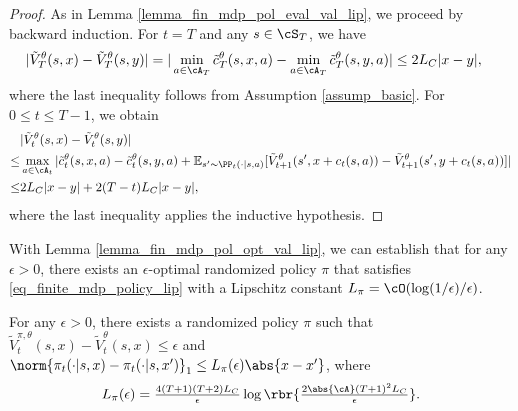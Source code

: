 \documentclass[9pt]{article}
\numberwithin{equation}{section}
\renewcommand{\frac}[2]{\tfrac{#1}{#2}}
\begin{document}
\begin{proof}
As in Lemma \ref{lemma_fin_mdp_pol_eval_val_lip}, we proceed by backward induction. For $t = T$ and any $s \in \cS_T$, we have
\begin{align*}
    | \tilde V_T^\theta(s,x) - \tilde V_T^\theta(s,y)| & = |\min_{a \in \cA_T} \tilde{c}_T^\theta(s,x,a) - \min_{a \in \cA_T} \tilde{c}_T^\theta(s,y,a)| 
     \leq 2L_C|x-y|,
\end{align*}
where the last inequality follows from Assumption \ref{assump_basic}. For $0 \leq t \leq T-1$, we obtain
\begin{align*}
     & |\tilde{V}_t^\theta(s,x) - \tilde{V}_t^\theta(s,y)| \\
     \leq & \max_{a \in \cA_t}|\tilde{c}_t^\theta(s,x,a) -  \tilde{c}_t^\theta(s,y,a) + \mathbb{E}_{s' \sim \PP_t(\cdot|s,a)}[\tilde{V}_{t+1}^\theta(s', x + c_t(s,a)) - \tilde{V}_{t+1}^\theta(s', y + c_t(s,a))]| \\
     \leq & 2L_C|x-y| + 2(T-t)L_C|x-y|,
\end{align*}
where the last inequality applies the inductive hypothesis.
\end{proof}
With Lemma \ref{lemma_fin_mdp_pol_opt_val_lip}, we can establish that for any $\epsilon > 0$, there exists an $\epsilon$-optimal  randomized policy $\pi$  that satisfies  \eqref{eq_finite_mdp_policy_lip} with a Lipschitz constant $L_{\pi} = \cO(\log(1/\epsilon)/\epsilon)$.


\begin{lemma}\label{lemma_close_to_opt_lip_policy_mdp}
    For any $\epsilon > 0$, there exists a randomized policy $\pi$ such that 
    $
            \tilde{V}^{\pi, \theta}_t(s,x) -  \tilde{V}^{ \theta}_t(s,x)  \leq \epsilon$
    and $
        \norm{
        \pi_t(\cdot|s,x) -  \pi_t(\cdot|s,x') 
        }_1 
         \leq 
        L_\pi(\epsilon) \abs{x - x'}
    $, 
where 
\begin{align}\label{lipschitz_const_approx_opt}
L_\pi(\epsilon) = \frac{4 (T+1)  (T+2) L_C}{\epsilon}
        \log \rbr{
        \frac{2  \abs{\cA} (T+1)^2 L_C }{\epsilon }
        } .
\end{align}
\end{lemma}
\end{document}
